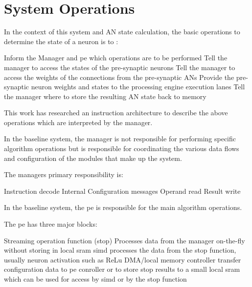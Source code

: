 

\chapter{System Operations}
\label{sec:System Operations}

In the context of this system and AN state calculation, the basic operations to determine the state of a neuron is to :
\begin{outline}
    \1 Inform the Manager and \ac{pe} which operations are to be performed
    \1 Tell the manager to access the states of the pre-synaptic neurons
    \1 Tell the manager to access the weights of the connections from the pre-synaptic ANs
    \1 Provide the pre-synaptic neuron weights and states to the processing engine execution lanes
    \1 Tell the manager where to store the resulting AN state back to memory
\end{outline}


This work has researched an instruction architecture to describe the above operations which are interpreted by the manager. 

In the baseline system, the manager is not responsible for performing specific algorithm operations but is responsible for coordinating the various data flows and configuration of the modules that make up the system.

The managers primary responsibility is:

\begin{outline}
    \1 Instruction decode
    \1 Internal Configuration messages
    \1 Operand read
    \1 Result write
\end{outline}

In the baseline system, the \ac{pe} is responsible for the main algorithm operations.

The \ac{pe} has three major blocks:

\begin{outline}
    \1 Streaming operation function (\ac{stop})
      \2 Processes data from the manager on-the-fly without storing in local \ac{sram}
    \1 \ac{simd}
      \2 processes the data from the \ac{stop} function, usually neuron activation such as ReLu
    \1 DMA/local memory controller
      \2 transfer configuration data to \ac{pe} conroller or to store \ac{stop} results to a small local \ac{sram} which can be used for access by \ac{simd} or by the \ac{stop} function
\end{outline}
